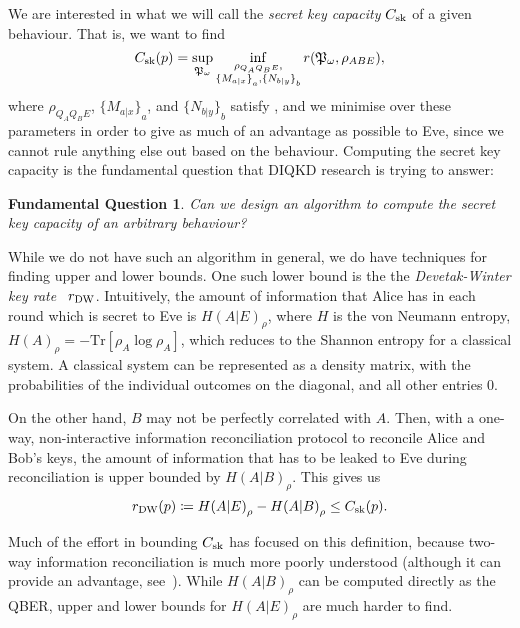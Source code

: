 \documentclass[10pt, a4paper]{article}
\numberwithin{equation}{section} %
\theoremstyle{definition}
\theoremstyle{plain}
\newtheorem{funqn}{Fundamental Question}
\newcommand{\?}{\mathrel{?}} %
\newcommand{\Tr}{\mathrm{Tr}} %
\newcommand{\sk}{\rm sk}
\newcommand{\DW}{\rm DW}
\begin{document}
    We are interested in what we will call the \emph{secret key capacity} \(C_{\sk}\) of a given behaviour. That is, we want to find 
    \begin{equation}\label{eqn:seckeycap}
      C_{\sk}(p) = \sup_{\mathfrak{P}_{\omega}} \inf_{ \substack{
          \rho_{Q_A Q_B E}, \\
          {\{M_{a|x}\}}_a, {\{N_{b|y}\}}_b
        }
      } r(\mathfrak{P}_{\omega}, \rho_{ABE}),
    \end{equation}
    where \(\rho_{Q_A Q_B E}\), \({\{M_{a|x}\}}_a\), and \({\{N_{b|y}\}}_b\) satisfy , and we minimise over these parameters in order to give as much of an advantage as possible to Eve, since we cannot rule anything else out based on the behaviour. Computing the secret key capacity is the fundamental question that DIQKD research is trying to answer:
    \begin{funqn}\label{fqn:cap}
      Can we design an algorithm to compute the secret key capacity of an arbitrary behaviour?
    \end{funqn}

    While we do not have such an algorithm in general, we do have techniques for finding upper and lower bounds. One such lower bound is the the \emph{Devetak-Winter key rate}~\cite{DevetakWinter} \(r_{\DW}\). Intuitively, the amount of information that Alice has in each round which is secret to Eve is \({H(A|E)}_{\rho}\), where \(H\) is the von Neumann entropy, \({H(A)}_{\rho} = -\Tr\left[\rho_{A}\log\rho_{A}\right]\), which reduces to the Shannon entropy for a classical system. A classical system can be represented as a density matrix, with the probabilities of the individual outcomes on the diagonal, and all other entries 0.

    On the other hand, \(B\) may not be perfectly correlated with \(A\). Then, with a one-way, non-interactive information reconciliation protocol to reconcile Alice and Bob's keys, the amount of information that has to be leaked to Eve during reconciliation is upper bounded by \({H(A|B)}_{\rho}\). This gives us
    \begin{equation}
      r_{\DW}(p) \coloneqq {H(A|E)}_{\rho} - {H(A|B)}_{\rho} \leq C_{\sk}(p).
    \end{equation}

    Much of the effort in bounding \(C_{\sk}\) has focused on this definition, because two-way information reconciliation is much more poorly understood (although it can provide an advantage, see~\cite{AdvantageDistill}).  While \({H(A|B)}_{\rho}\) can be computed directly as the QBER, upper and lower bounds for \({H(A|E)}_{\rho}\) are much harder to find.
\end{document}
